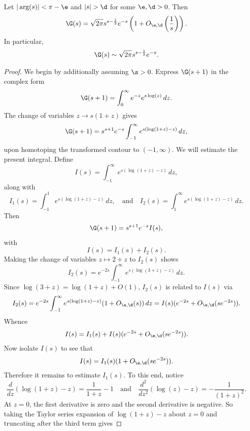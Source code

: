 \documentclass[12pt]{article}
\begin{document}
      \begin{theorem*}
        Let \(|\arg(s)| < \pi-\e\) and \(|s| > \d\) for some \(\e,\d > 0\). Then
        \[
          \G(s) = \sqrt{2\pi}s^{s-\frac{1}{2}}e^{-s}\left(1+O_{\e,\d}\left(\frac{1}{s}\right)\right).
        \]
        In particular,
        \[
          \G(s) \sim \sqrt{2\pi}s^{s-\frac{1}{2}}e^{-s}.
        \]
      \end{theorem*}
      \begin{proof}
        We begin by additionally assuming \(\s > 0\). Express \(\G(s+1)\) in the complex form
        \[
          \G(s+1) = \int_{0}^{\infty}e^{-z}e^{s\log(z)}\,dz.
        \]
        The change of variables \(z \to s(1+z)\) gives
        \[
          \G(s+1) = s^{s+1}e^{-s}\int_{-1}^{\infty}e^{s(\log(1+z)-z)}\,dz,
        \]
        upon homotoping the transformed contour to \((-1,\infty)\). We will estimate the present integral. Define
        \[
          I(s) = \int_{-1}^{\infty}e^{s(\log(1+z)-z)}\,dz,
        \]
        along with
        \[
          I_{1}(s) = \int_{-1}^{1}e^{s(\log(1+z)-z)}\,dz, \quad \text{and} \quad I_{2}(s) = \int_{1}^{\infty}e^{s(\log(1+z)-z)}\,dz.
        \]
        Then
        \begin{equation}\label{equ:Stirlings_formula_1}
          \G(s+1) = s^{s+1}e^{-s}I(s),
        \end{equation}
        with
        \[
          I(s) = I_{1}(s)+I_{2}(s).
        \]
        Making the change of variables \(z \mapsto 2+z\) to \(I_{2}(s)\) shows
        \[
          I_{2}(s) = e^{-2s}\int_{-1}^{\infty}e^{s(\log(3+z)-z)}\,dz.
        \]
        Since \(\log(3+z) = \log(1+z)+O(1)\), \(I_{2}(s)\) is related to \(I(s)\) via
        \[
          I_{2}(s) = e^{-2s}\int_{-1}^{\infty}e^{s(\log(1+z)-z)}(1+O_{\e,\d}(s))\,dz = I(s)(e^{-2s}+O_{\e,\d}(se^{-2s})).
        \]
        Whence
        \[
          I(s) = I_{1}(s)+I(s)(e^{-2s}+O_{\e,\d}(se^{-2s})).
        \]
        Now isolate \(I(s)\) to see that
        \begin{equation}\label{equ:Stirlings_formula_2}
          I(s) = I_{1}(s)(1+O_{\e,\d}(se^{-2s})).
        \end{equation}
        Therefore it remains to estimate \(I_{1}(s)\). To this end, notice
        \[
          \frac{d}{dz}(\log(1+z)-z) = \frac{1}{1+z}-1 \quad \text{and} \quad \frac{d^{2}}{dz^{2}}(\log(z)-z) = -\frac{1}{(1+z)^{2}}.
        \]
        At \(z = 0\), the first derivative is zero and the second derivative is negative. So taking the Taylor series expansion of \(\log(1+z)-z\) about \(z = 0\) and truncating after the third term gives

\end{proof}
\end{document}
